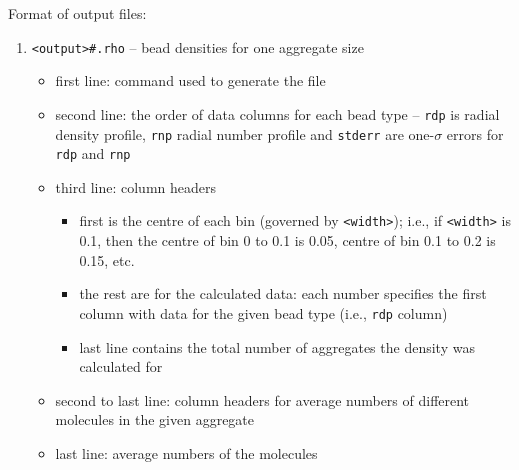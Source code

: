 \noindent
Format of output files:
\begin{enumerate}[nosep,leftmargin=20pt]
  \item \texttt{<output>\#.rho} -- bead densities for one aggregate size
    \begin{itemize}[nosep,leftmargin=5pt]
      \item first line: command used to generate the file
      \item second line: the order of data columns for each bead type --
        \texttt{rdp} is radial density profile, \texttt{rnp} radial number
        profile and \texttt{stderr} are one-$\sigma$ errors for \texttt{rdp}
        and \texttt{rnp}
      \item third line: column headers
        \begin{itemize}[nosep,leftmargin=10pt]
          \item first is the centre of each bin (governed by
            \texttt{<width>}); i.e., if \texttt{<width>} is 0.1,
            then the centre of bin 0 to 0.1 is 0.05, centre of bin 0.1 to
            0.2 is 0.15, etc.
          \item the rest are for the calculated data: each number specifies
            the first column with data for the given bead type (i.e.,
            \texttt{rdp} column)
          \item last line contains the total number of aggregates the
            density was calculated for
        \end{itemize}
      \item second to last line: column headers for average numbers of
        different molecules in the given aggregate
      \item last line: average numbers of the molecules
    \end{itemize}
\end{enumerate}
